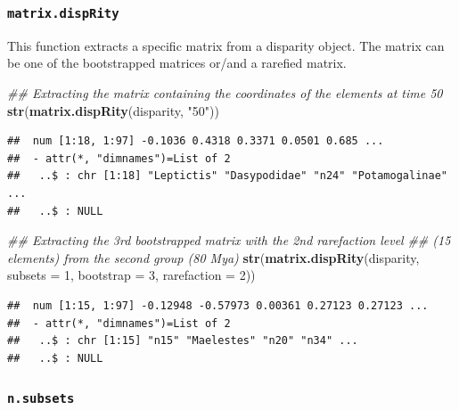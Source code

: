 \documentclass[]{book}
\newenvironment{Shaded}{\begin{snugshade}}{\end{snugshade}}
\newcommand{\CommentTok}[1]{\textcolor[rgb]{0.56,0.35,0.01}{\textit{#1}}}
\newcommand{\DataTypeTok}[1]{\textcolor[rgb]{0.13,0.29,0.53}{#1}}
\newcommand{\DecValTok}[1]{\textcolor[rgb]{0.00,0.00,0.81}{#1}}
\newcommand{\KeywordTok}[1]{\textcolor[rgb]{0.13,0.29,0.53}{\textbf{#1}}}
\newcommand{\NormalTok}[1]{#1}
\newcommand{\StringTok}[1]{\textcolor[rgb]{0.31,0.60,0.02}{#1}}
\begin{document}
\hypertarget{matrix.disprity}{%
\subsubsection{\texorpdfstring{\texttt{matrix.dispRity}}{matrix.dispRity}}\label{matrix.disprity}}

This function extracts a specific matrix from a disparity object.
The matrix can be one of the bootstrapped matrices or/and a rarefied matrix.

\begin{Shaded}
\begin{Highlighting}[]
\CommentTok{## Extracting the matrix containing the coordinates of the elements at time 50}
\KeywordTok{str}\NormalTok{(}\KeywordTok{matrix.dispRity}\NormalTok{(disparity, }\StringTok{"50"}\NormalTok{))}
\end{Highlighting}
\end{Shaded}

\begin{verbatim}
##  num [1:18, 1:97] -0.1036 0.4318 0.3371 0.0501 0.685 ...
##  - attr(*, "dimnames")=List of 2
##   ..$ : chr [1:18] "Leptictis" "Dasypodidae" "n24" "Potamogalinae" ...
##   ..$ : NULL
\end{verbatim}

\begin{Shaded}
\begin{Highlighting}[]
\CommentTok{## Extracting the 3rd bootstrapped matrix with the 2nd rarefaction level}
\CommentTok{## (15 elements) from the second group (80 Mya)}
\KeywordTok{str}\NormalTok{(}\KeywordTok{matrix.dispRity}\NormalTok{(disparity, }\DataTypeTok{subsets =} \DecValTok{1}\NormalTok{, }\DataTypeTok{bootstrap =} \DecValTok{3}\NormalTok{, }\DataTypeTok{rarefaction =} \DecValTok{2}\NormalTok{))}
\end{Highlighting}
\end{Shaded}

\begin{verbatim}
##  num [1:15, 1:97] -0.12948 -0.57973 0.00361 0.27123 0.27123 ...
##  - attr(*, "dimnames")=List of 2
##   ..$ : chr [1:15] "n15" "Maelestes" "n20" "n34" ...
##   ..$ : NULL
\end{verbatim}

\hypertarget{n.subsets}{%
\subsubsection{\texorpdfstring{\texttt{n.subsets}}{n.subsets}}\label{n.subsets}}
\end{document}
